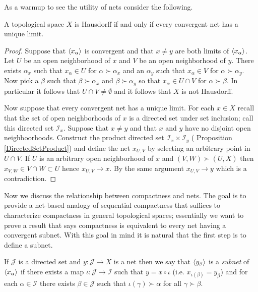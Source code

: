 As a warmup to see the utility of nets consider the following.
\begin{prop}\label{HausdorffUniqueLimits}A topological space $X$ is Hausdorff if and only if every convergent net has a unique limit.
\end{prop}
\begin{proof}
Suppose that $\langle x_{\alpha} \rangle$ is convergent and that $x \neq y$ are both limits of $\langle x_{\alpha} \rangle$.  Let $U$  be an open neighborhood of $x$ and $V$  be an open neighborhood of $y$.  There exists $\alpha_x$ such that $x_\alpha \in U$ for $\alpha \succ \alpha_x$ and an $\alpha_y$ such that $x_\alpha \in V$ for $\alpha \succ \alpha_y$.  Now pick a
$\beta$ such that $\beta \succ \alpha_x$ and $\beta \succ \alpha_y$ so that $x_\alpha \in U \cap V$ for $\alpha \succ \beta$.  In particular it follows that $U \cap V \neq \emptyset$ and it follows that $X$ is not Hausdorff.

Now suppose that every convergent net has a unique limit.  For each $x \in X$ recall that the set of open neighborhoods of $x$ is a directed set under set inclusion; call this directed set $\mathcal{I}_x$.  Suppose that $x \neq y$ and that $x$ and $y$ have no disjoint open neighboorhoods.   Construct the product directed set $\mathcal{I}_x \times \mathcal{I}_y$ ( Proposition \ref{DirectedSetProduct})  and define the net $x_{U,V}$ by selecting an arbitrary point in $U \cap V$.  If $U$ is an arbitrary open neighborhood of $x$ and $(V,W) \succ (U,X)$ then $x_{V,W} \in V \cap W \subset U$ hence $x_{U,V} \to x$.  By the same argument $x_{U,V} \to y$ which is a contradiction.
\end{proof}



Now we discuss the relationship between compactness and nets.  The goal is to provide a net-based analogy of sequential compactness that suffices to characterize compactness in general topological spaces; essentially we want to prove a result that says compactness is equivalent to every net having a convergent subnet.   With this goal in mind it is natural that the first step is to define a subnet.
\begin{defn}\label{defn:Subnet}If $\mathcal{J}$ is a directed set and $y : \mathcal{J} \to X$ is a net then we say that $\langle y_{\beta} \rangle$ is a \emph{subnet}
of $\langle x_{\alpha} \rangle$ if there exists a map $\iota : \mathcal{J} \to \mathcal{I}$ such that $y = x \circ \iota$ (i.e. $x_{\iota(\beta)} = y_\beta$) and for each $\alpha \in \mathcal{I}$ there
exists $\beta \in \mathcal{J}$ such that $\iota(\gamma) \succ \alpha$ for all $\gamma \succ \beta$. 
\end{defn}

